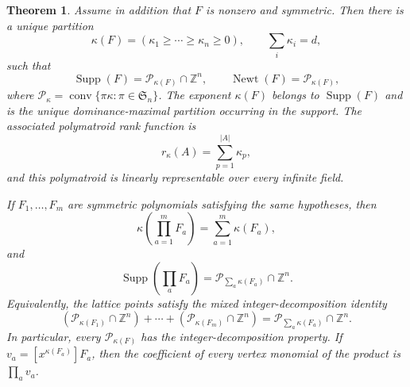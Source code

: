 \documentclass[11pt,a4paper,oneside]{amsart}
\numberwithin{equation}{section}
\newtheorem{theorem}{Theorem}[section]
\theoremstyle{definition}
\theoremstyle{remark}
\DeclareMathOperator{\Supp}{Supp}
\DeclareMathOperator{\Newt}{Newt}
\DeclareMathOperator{\conv}{conv}
\newcommand{\Z}{\mathbb Z}
\begin{document}
\begin{theorem}\label{thm:symmetric-permutahedron}
Assume in addition that $F$ is nonzero and symmetric.  Then there is a unique partition
\[
 \kappa(F)=(\kappa_1\geq\cdots\geq\kappa_n\geq0),
 \qquad \sum_i\kappa_i=d,
\]
such that
\begin{equation}\label{eq:symmetric-support}
 \Supp(F)=\mathcal P_{\kappa(F)}\cap\Z^n,
 \qquad
 \Newt(F)=\mathcal P_{\kappa(F)},
\end{equation}
where $\mathcal P_\kappa=\conv\{\pi\kappa:\pi\in\mathfrak S_n\}$.  The exponent $\kappa(F)$ belongs to $\Supp(F)$ and is the unique dominance-maximal partition occurring in the support.  The associated polymatroid rank function is
\begin{equation}\label{eq:symmetric-rank-function}
 r_\kappa(A)=\sum_{p=1}^{|A|}\kappa_p,
\end{equation}
and this polymatroid is linearly representable over every infinite field.

If $F_1,\ldots,F_m$ are symmetric polynomials satisfying the same hypotheses, then
\begin{equation}\label{eq:product-kappa}
 \kappa\left(\prod_{a=1}^mF_a\right)=\sum_{a=1}^m\kappa(F_a),
\end{equation}
and
\begin{equation}\label{eq:product-support-general}
 \Supp\left(\prod_aF_a\right)
 =\mathcal P_{\sum_a\kappa(F_a)}\cap\Z^n.
\end{equation}
Equivalently, the lattice points satisfy the mixed integer-decomposition identity
\begin{equation}\label{eq:mixed-IDP}
 \left(\mathcal P_{\kappa(F_1)}\cap\Z^n\right)+\cdots+
 \left(\mathcal P_{\kappa(F_m)}\cap\Z^n\right)
 =\mathcal P_{\sum_a\kappa(F_a)}\cap\Z^n.
\end{equation}
In particular, every $\mathcal P_{\kappa(F)}$ has the integer-decomposition
property.  If $v_a=[x^{\kappa(F_a)}]F_a$, then the coefficient of every vertex monomial of the product is $\prod_a v_a$.
\end{theorem}
\end{document}
